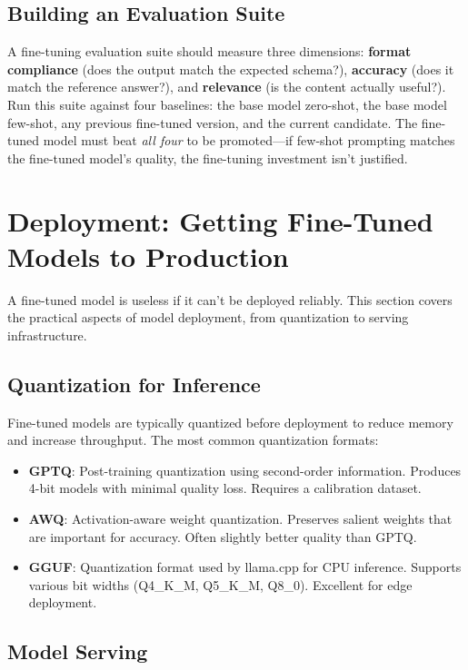 \subsection{Building an Evaluation Suite}

A fine-tuning evaluation suite should measure three dimensions: \textbf{format compliance} (does the output match the expected schema?), \textbf{accuracy} (does it match the reference answer?), and \textbf{relevance} (is the content actually useful?). Run this suite against four baselines: the base model zero-shot, the base model few-shot, any previous fine-tuned version, and the current candidate. The fine-tuned model must beat \emph{all four} to be promoted---if few-shot prompting matches the fine-tuned model's quality, the fine-tuning investment isn't justified.

\section{Deployment: Getting Fine-Tuned Models to Production}
\label{sec:deployment}

A fine-tuned model is useless if it can't be deployed reliably. This section covers the practical aspects of model deployment, from quantization to serving infrastructure.

\subsection{Quantization for Inference}

Fine-tuned models are typically quantized before deployment to reduce memory and increase throughput. The most common quantization formats:

\begin{itemize}[leftmargin=*]
    \item \textbf{GPTQ}: Post-training quantization using second-order information. Produces 4-bit models with minimal quality loss. Requires a calibration dataset.
    \item \textbf{AWQ}: Activation-aware weight quantization. Preserves salient weights that are important for accuracy. Often slightly better quality than GPTQ.
    \item \textbf{GGUF}: Quantization format used by llama.cpp for CPU inference. Supports various bit widths (Q4\_K\_M, Q5\_K\_M, Q8\_0). Excellent for edge deployment.
\end{itemize}

\subsection{Model Serving}

